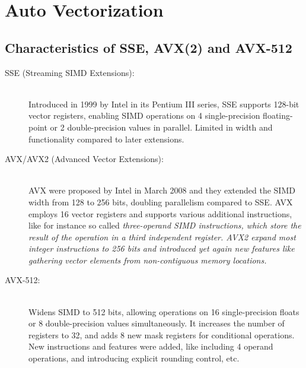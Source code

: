 \documentclass[../../main.tex]{subfiles}
\begin{document}
    \section{Auto Vectorization}
    \subsection{Characteristics of SSE, AVX(2) and AVX-512}

    \begin{description}
        \item[SSE (Streaming SIMD Extensions):] ~\\ Introduced in 1999 by Intel in its Pentium III series\footnotemark,  SSE supports 128-bit vector registers, enabling SIMD operations on 4 single-precision floating-point or 2 double-precision values in parallel. Limited in width and functionality compared to later extensions. \\
        \item[AVX/AVX2 (Advanced Vector Extensions):] ~\\ AVX were proposed by Intel in March 2008 and they extended the SIMD width from 128 to 256 bits, doubling parallelism compared to SSE\footnotemark. AVX employs 16 vector registers and supports various additional instructions, like for instance so called \em three-operand SIMD instructions\em, which store the result of the operation in a third independent register. AVX2 expand most integer instructions to 256 bits and introduced yet again new features like gathering vector elements from non-contiguous memory locations.  \\
        \item[AVX-512:] ~\\ Widens SIMD to 512 bits, allowing operations on 16 single-precision floats or 8 double-precision values simultaneously. It increases the number of registers to 32, and adds 8 new mask registers for conditional operations\footnotemark. New instructions and features were added, like including 4 operand operations, and introducing explicit rounding control, etc.\\
    \end{description}
\end{document}
